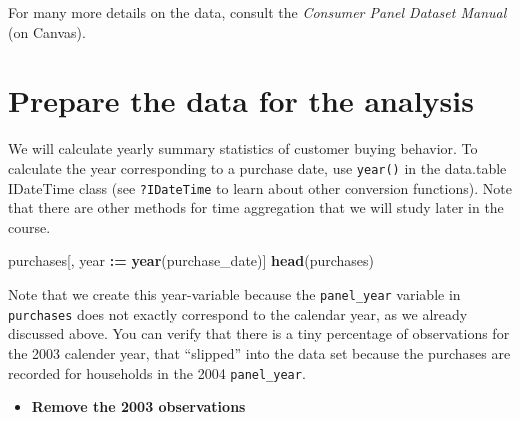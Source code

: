\documentclass[
]{article}
\newenvironment{Shaded}{\begin{snugshade}}{\end{snugshade}}
\newcommand{\CommentTok}[1]{\textcolor[rgb]{0.56,0.35,0.01}{\textit{#1}}}
\newcommand{\DecValTok}[1]{\textcolor[rgb]{0.00,0.00,0.81}{#1}}
\newcommand{\FunctionTok}[1]{\textcolor[rgb]{0.13,0.29,0.53}{\textbf{#1}}}
\newcommand{\NormalTok}[1]{#1}
\newcommand{\OtherTok}[1]{\textcolor[rgb]{0.56,0.35,0.01}{#1}}
\newcommand{\SpecialCharTok}[1]{\textcolor[rgb]{0.81,0.36,0.00}{\textbf{#1}}}
\providecommand{\tightlist}{%
  \setlength{\itemsep}{0pt}\setlength{\parskip}{0pt}}
\begin{document}
For many more details on the data, consult the \emph{Consumer Panel
Dataset Manual} (on Canvas).

\newpage

\section{Prepare the data for the
analysis}\label{prepare-the-data-for-the-analysis}

We will calculate yearly summary statistics of customer buying behavior.
To calculate the year corresponding to a purchase date, use
\texttt{year()} in the data.table IDateTime class (see
\texttt{?IDateTime} to learn about other conversion functions). Note
that there are other methods for time aggregation that we will study
later in the course.

\begin{Shaded}
\begin{Highlighting}[]
\NormalTok{purchases[, year }\SpecialCharTok{:=} \FunctionTok{year}\NormalTok{(purchase\_date)]}
\FunctionTok{head}\NormalTok{(purchases)}
\end{Highlighting}
\end{Shaded}

Note that we create this year-variable because the \texttt{panel\_year}
variable in \texttt{purchases} does not exactly correspond to the
calendar year, as we already discussed above. You can verify that there
is a tiny percentage of observations for the 2003 calender year, that
``slipped'' into the data set because the purchases are recorded for
households in the 2004 \texttt{panel\_year}.

\begin{itemize}
\tightlist
\item
  \textbf{Remove the 2003 observations}
\end{itemize}

\begin{Shaded}
\end{Shaded}
\end{document}
